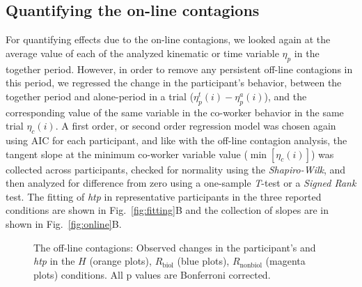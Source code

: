 \subsection{Quantifying the on-line contagions}
For quantifying effects due to the on-line contagions, we looked again at the average value of each of the analyzed kinematic or time variable $\eta_p$ in the together period. However, in order to remove any persistent off-line contagions in this period, we regressed the change in the participant's behavior, between the together period and alone-period in a trial ($\eta_p^t (i)- \eta_p^a (i)$), and the corresponding value of the same variable in the co-worker behavior in the same trial $\eta_c(i)$. A first order, or second order regression model was chosen again using AIC for each participant, and like with the off-line contagion analysis, the tangent slope at the minimum co-worker variable value ($\min[\eta_c(i)]$) was collected across participants, checked for normality using the {\it Shapiro-Wilk}, and then analyzed for difference from zero using a one-sample {\it T}-test or a {\it Signed Rank} test. The fitting of {\it htp} in representative participants in the three reported conditions are shown in Fig.~\ref{fig:fitting}B and the collection of slopes are in shown in Fig.~\ref{fig:online}B.

\begin{figure}[t]
	\caption{The off-line contagions: Observed changes in the participant's  and \textit{htp} in the $\textit{H}$ (orange plots), $\textit{R}_{\text{biol}}$ (blue plots), $\textit{R}_{\text{nonbiol}}$ (magenta plots) conditions. All p values are Bonferroni corrected.}
	\label{fig:offline}
\end{figure}

